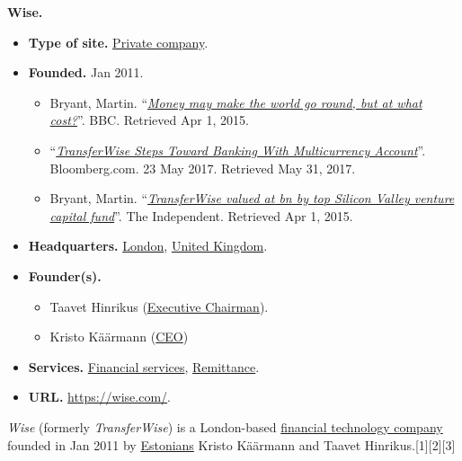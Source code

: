 \documentclass{book}
\numberwithin{equation}{section}
\begin{document}
\textbf{Wise.}
\begin{itemize}
    \item \textbf{Type of site.} \href{https://en.wikipedia.org/wiki/Private_company}{Private company}.
    \item \textbf{Founded.} Jan 2011.
    \begin{itemize}
        \item Bryant, Martin. ``\href{https://www.bbc.co.uk/news/business-31639262}{\textit{Money may make the world go round, but at what cost?}}''. BBC. Retrieved Apr 1, 2015.
        \item ``\href{https://www.bloomberg.com/news/articles/2017-05-23/transferwise-steps-toward-banking-with-multicurrency-account}{\textit{TransferWise Steps Toward Banking With Multicurrency Account}}''. Bloomberg.com. 23 May 2017. Retrieved May 31, 2017.
        \item Bryant, Martin. ``\href{https://www.independent.co.uk/news/business/news/transferwise-valued-at-1bn-by-top-silicon-valley-venture-capital-fund-10002618.html}{\textit{TransferWise valued at bn by top Silicon Valley venture capital fund}}''. The Independent. Retrieved Apr 1, 2015.
    \end{itemize}
    \item \textbf{Headquarters.} \href{https://en.wikipedia.org/wiki/London}{London}, \href{https://en.wikipedia.org/wiki/United_Kingdom}{United Kingdom}.
    \item \textbf{Founder(s).}
    \begin{itemize}
        \item Taavet Hinrikus (\href{https://en.wikipedia.org/wiki/Executive_Chairman}{Executive Chairman}).
        \item Kristo Käärmann (\href{https://en.wikipedia.org/wiki/Chief_executive_officer}{CEO})
    \end{itemize} 
    \item \textbf{Services.} \href{https://en.wikipedia.org/wiki/Financial_services}{Financial services}, \href{https://en.wikipedia.org/wiki/Remittance}{Remittance}.
    \item \textbf{URL.} \url{https://wise.com/}.
\end{itemize}
\textit{Wise} (formerly \textit{TransferWise}) is a London-based \href{https://en.wikipedia.org/wiki/Financial_technology}{financial technology company} founded in Jan 2011 by \href{https://en.wikipedia.org/wiki/Estonians}{Estonians} Kristo Käärmann and Taavet Hinrikus.[1][2][3]
\end{document}
